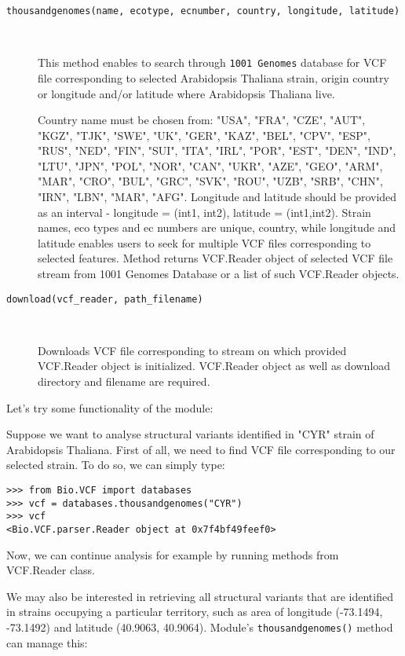 \begin{description}
  \item[\texttt{thousandgenomes(name, ecotype, ecnumber, country, longitude, latitude)}] \

    This method enables to search through \verb|1001 Genomes| database for VCF file corresponding to selected
    Arabidopsis Thaliana strain, origin country or longitude and/or latitude where Arabidopsis Thaliana live.

    Country name must be chosen from: "USA", "FRA", "CZE", "AUT", "KGZ", "TJK", "SWE", "UK", "GER", "KAZ",
    "BEL", "CPV", "ESP", "RUS", "NED", "FIN", "SUI", "ITA", "IRL", "POR", "EST", "DEN", "IND", "LTU", "JPN", "POL", "NOR",
    "CAN", "UKR", "AZE", "GEO", "ARM", "MAR", "CRO", "BUL", "GRC", "SVK", "ROU", "UZB", "SRB", "CHN", "IRN", "LBN", "MAR",
    "AFG".
    Longitude and latitude should be provided as an interval - longitude = (int1, int2), latitude = (int1,int2).
    Strain names, eco types and ec numbers are unique, country, while longitude and latitude enables users to seek for
    multiple VCF files corresponding to selected features.
    Method returns VCF.Reader object of selected VCF file stream from 1001 Genomes Database or a list of
    such VCF.Reader objects.

\item[\texttt{download(vcf\_reader, path\_filename)}] \

    Downloads VCF file corresponding to stream on which provided VCF.Reader object is initialized.
    VCF.Reader object as well as download directory and filename are required.


\end{description}

\noindent Let's try some functionality of the module:

\noindent Suppose we want to analyse structural variants identified in "CYR" strain of Arabidopsis Thaliana. First of all,
we need to find VCF file corresponding to our selected strain. To do so, we can simply type:


\begin{verbatim}
>>> from Bio.VCF import databases
>>> vcf = databases.thousandgenomes("CYR")
>>> vcf
<Bio.VCF.parser.Reader object at 0x7f4bf49feef0>

\end{verbatim}


\noindent Now, we can continue analysis for example by running methods from VCF.Reader class.


\noindent We may also be interested in retrieving all structural variants that are identified in strains occupying a particular
territory, such as area of longitude (-73.1494, -73.1492) and latitude (40.9063, 40.9064). Module's \verb|thousandgenomes()|
method can manage this:


